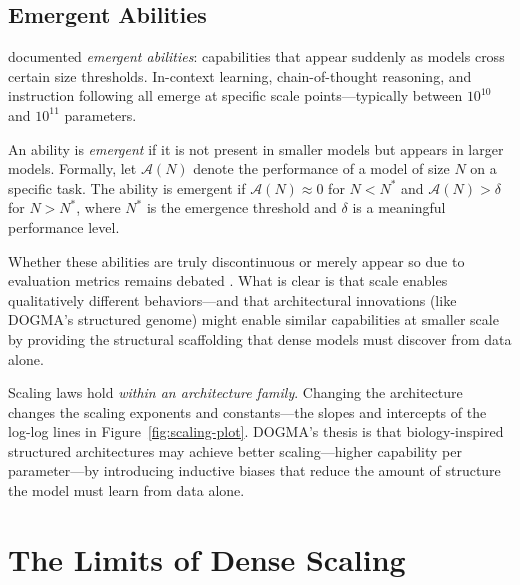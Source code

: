\subsection{Emergent Abilities}
\label{sec:emergent-abilities}

\citet{wei2022} documented \emph{emergent abilities}: capabilities that appear suddenly as models cross certain size thresholds. In-context learning, chain-of-thought reasoning, and instruction following all emerge at specific scale points---typically between $10^{10}$ and $10^{11}$ parameters.

\begin{definition}
An ability is \emph{emergent} if it is not present in smaller models but appears in larger models. Formally, let $\mathcal{A}(N)$ denote the performance of a model of size $N$ on a specific task. The ability is emergent if $\mathcal{A}(N) \approx 0$ for $N < N^*$ and $\mathcal{A}(N) > \delta$ for $N > N^*$, where $N^*$ is the emergence threshold and $\delta$ is a meaningful performance level.
\end{definition}

Whether these abilities are truly discontinuous or merely appear so due to evaluation metrics remains debated \citep{schaeffer2023}. What is clear is that scale enables qualitatively different behaviors---and that architectural innovations (like DOGMA's structured genome) might enable similar capabilities at smaller scale by providing the structural scaffolding that dense models must discover from data alone.

\begin{keyinsight}
Scaling laws hold \emph{within an architecture family}. Changing the architecture changes the scaling exponents and constants---the slopes and intercepts of the log-log lines in Figure~\ref{fig:scaling-plot}. DOGMA's thesis is that biology-inspired structured architectures may achieve better scaling---higher capability per parameter---by introducing inductive biases that reduce the amount of structure the model must learn from data alone.
\end{keyinsight}

\section{The Limits of Dense Scaling}
\label{sec:limits-scaling}

